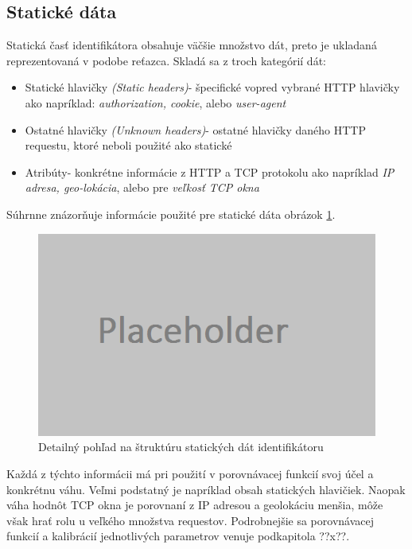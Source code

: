 \documentclass[
  printed, %
  table,   %
  lof,     %
  lot,     %
]{fithesis3}
\begin{document}
\subsection{Statické dáta}
Statická časť identifikátora obsahuje väčšie množstvo dát, preto je
ukladaná reprezentovaná v podobe reťazca. Skladá sa z troch kategórií dát:
\begin{itemize}
    \item Statické hlavičky \textit{(Static headers)}- špecifické vopred
    vybrané HTTP hlavičky ako napríklad: \textit{authorization, cookie}, alebo
    \textit{user-agent}
    \item Ostatné hlavičky \textit{(Unknown headers)}- ostatné hlavičky daného
    HTTP requestu, ktoré neboli použité ako statické
    \item Atribúty- konkrétne informácie z HTTP a TCP protokolu ako napríklad
    \textit{IP adresa, geo-lokácia}, alebo pre \textit{veľkosť TCP okna}
\end{itemize}

Súhrnne znázorňuje informácie použité pre statické dáta obrázok
\ref{fig:footprint-data-static}.

\begin{figure}[h]
  \centering
    \includegraphics[width=.99\textwidth]{images/footprint-data-static.png}
  \caption{Detailný pohľad na štruktúru statických dát identifikátoru}
  \label{fig:footprint-data-static}
\end{figure}

Každá z týchto informácii má pri použití v porovnávacej funkcií svoj účel a
konkrétnu váhu. Veľmi podstatný je napríklad obsah statických hlavičiek. Naopak
váha hodnôt TCP okna je porovnaní z IP adresou a geolokáciu menšia, môže však
hrať rolu u veľkého množstva requestov. Podrobnejšie sa porovnávacej funkcií a
kalibrácií jednotlivých parametrov venuje podkapitola ??x??.
\end{document}
